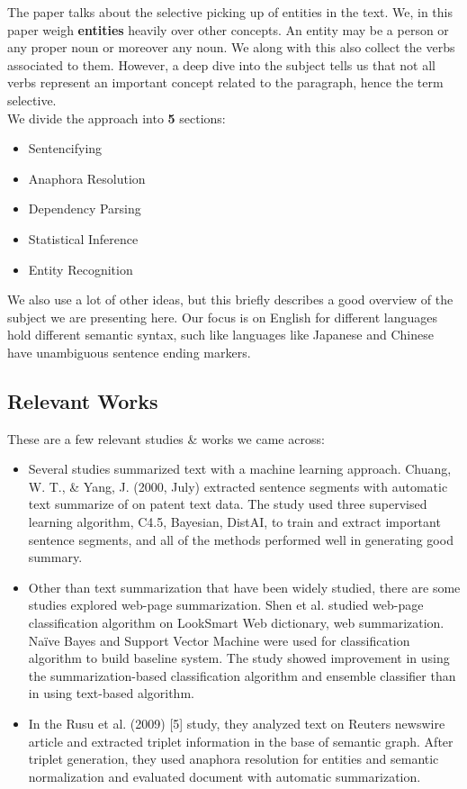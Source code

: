 \documentclass[conference]{IEEEtran}
\begin{document}
The paper talks about the selective picking up of entities in the text. We, in this paper weigh \textbf{entities} heavily over other concepts. An entity may be a person or any proper noun or moreover any noun. We along with this also collect the verbs associated to them. However, a deep dive into the subject tells us that not all verbs represent an important concept related to the paragraph, hence the term selective.\\
We divide the approach into \textbf{5} sections:
\begin{itemize}
\item Sentencifying
\item Anaphora Resolution
\item Dependency Parsing
\item Statistical Inference
\item Entity Recognition
\end{itemize}

We also use a lot of other ideas, but this briefly describes a good overview of the subject we are presenting here. Our focus is on English for different languages hold different semantic syntax, such like languages like Japanese and Chinese have unambiguous sentence ending markers.

\subsection{Relevant Works}
These are a few relevant studies \& works we came across:
\begin{itemize}
\item Several studies summarized text with a machine learning approach. Chuang, W. T., \& Yang, J. (2000, July) extracted sentence segments with automatic text summarize of on patent text data. The study used three supervised learning algorithm, C4.5, Bayesian, DistAI, to train and extract important sentence segments, and all of the methods performed well in generating good summary.

\item Other than text summarization that have been widely studied, there are some studies explored web-page summarization. Shen et al. studied web-page classification algorithm on LookSmart Web dictionary, web summarization. Naïve Bayes and Support Vector Machine were used for classification algorithm to build baseline system. The study showed improvement in using the summarization-based classification algorithm and ensemble classifier than in using text-based algorithm.

\item In the Rusu et al. (2009) [5] study, they analyzed text on Reuters newswire article and extracted triplet information in the base of semantic graph. After triplet generation, they used anaphora resolution for entities and semantic normalization and evaluated document with automatic summarization.
\end{itemize}
\end{document}
